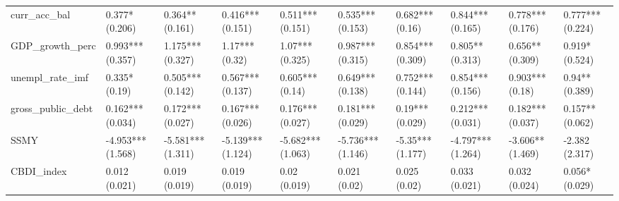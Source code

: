 \begin{table}[ht]
\begin{tabular}{llllllllll}
  curr\_acc\_bal & 0.377* (0.206) & 0.364** (0.161) & 0.416*** (0.151) & 0.511*** (0.151) & 0.535*** (0.153) & 0.682*** (0.16) & 0.844*** (0.165) & 0.778*** (0.176) & 0.777*** (0.224) \\ 
  GDP\_growth\_perc & 0.993*** (0.357) & 1.175*** (0.327) & 1.17*** (0.32) & 1.07*** (0.325) & 0.987*** (0.315) & 0.854*** (0.309) & 0.805** (0.313) & 0.656** (0.309) & 0.919* (0.524) \\ 
  unempl\_rate\_imf & 0.335* (0.19) & 0.505*** (0.142) & 0.567*** (0.137) & 0.605*** (0.14) & 0.649*** (0.138) & 0.752*** (0.144) & 0.854*** (0.156) & 0.903*** (0.18) & 0.94** (0.389) \\ 
  gross\_public\_debt & 0.162*** (0.034) & 0.172*** (0.027) & 0.167*** (0.026) & 0.176*** (0.027) & 0.181*** (0.029) & 0.19*** (0.029) & 0.212*** (0.031) & 0.182*** (0.037) & 0.157** (0.062) \\ 
  SSMY & -4.953*** (1.568) & -5.581*** (1.311) & -5.139*** (1.124) & -5.682*** (1.063) & -5.736*** (1.146) & -5.35*** (1.177) & -4.797*** (1.264) & -3.606** (1.469) & -2.382 (2.317) \\ 
  CBDI\_index & 0.012 (0.021) & 0.019 (0.019) & 0.019 (0.019) & 0.02 (0.019) & 0.021 (0.02) & 0.025 (0.02) & 0.033 (0.021) & 0.032 (0.024) & 0.056* (0.029) \\ 
   \bottomrule
\end{tabular}
\endgroup
\end{table}
